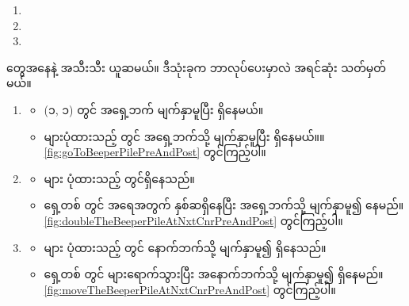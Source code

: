 \begin{sloppypar}
\begin{enumerate}
  \item {}
  \item {}
  \item {}
\end{enumerate}
\mmcommand တွေအနေနဲ့ အသီးသီး ယူဆမယ်။ ဒီသုံးခုက ဘာလုပ်ပေးမှာလဲ အရင်ဆုံး သတ်မှတ်မယ်။ 
\begin{enumerate}
  \item {}
  \begin{itemize}
    \item (၁, ၁) \mmcorner တွင် အရှေ့ဘက် မျက်နှာမူပြီး ရှိနေမယ်။
    \item \mmbeeper များပုံထားသည့် \mmcorner တွင် အရှေ့ဘက်သို့ မျက်နှာမူပြီး ရှိနေမယ်။။ \Fig \ref{fig:goToBeeperPilePreAndPost} တွင်ကြည့်ပါ။
  \end{itemize}
  \item {}  
    \begin{itemize}
      \item \mmbeeper များ ပုံထားသည့် \mmcorner  တွင်ရှိနေသည်။
      \item ရှေ့တစ် \mmcorner တွင် \mmbeeper အရေအတွက် နှစ်ဆရှိနေပြီး အရှေ့ဘက်သို့ မျက်နှာမူ၍ နေမည်။ \Fig \ref{fig:doubleTheBeeperPileAtNxtCnrPreAndPost} တွင်ကြည့်ပါ။
    \end{itemize} 
  \item {}
    \begin{itemize}
      \item \mmbeeper များ ပုံထားသည့် \mmcorner  တွင် နောက်ဘက်သို့ မျက်နှာမူ၍ ရှိနေသည်။
      \item ရှေ့တစ် \mmcorner တွင် \mmbeeper များရောက်သွားပြီး အနောက်ဘက်သို့ မျက်နှာမူ၍ ရှိနေမည်။  \Fig \ref{fig:moveTheBeeperPileAtNxtCnrPreAndPost} တွင်ကြည့်ပါ။
    \end{itemize}   
\end{enumerate}


\end{sloppypar}
